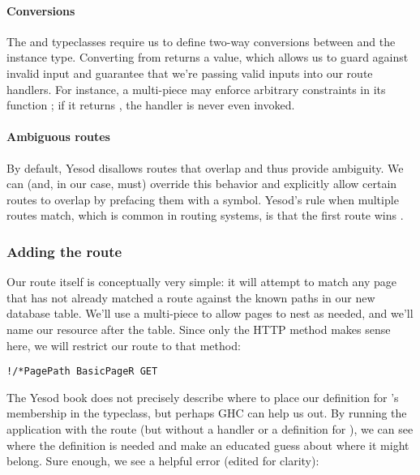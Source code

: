 \paragraph{Conversions} The  and  typeclasses require us to define two-way conversions between  and the instance type. Converting from  returns a  value, which allows us to guard against invalid input and guarantee that we're passing valid inputs into our route handlers. For instance, a multi-piece may enforce arbitrary constraints in its function ; if it returns , the handler is never even invoked.

\paragraph{Ambiguous routes} By default, Yesod disallows routes that overlap and thus provide ambiguity. We can (and, in our case, must) override this behavior and explicitly allow certain routes to overlap by prefacing them with a \code{!} symbol. Yesod's rule when multiple routes match, which is common in routing systems, is that the first route wins \cite{ybkRouting}.

\subsubsection{Adding the route}

Our route itself is conceptually very simple: it will attempt to match any page that has not already matched a route against the known paths in our new database table. We'll use a multi-piece to allow pages to nest as needed, and we'll name our resource after the  table. Since only the  HTTP method makes sense here, we will restrict our route to that method:

\begin{Verbatim}
!/*PagePath BasicPageR GET
\end{Verbatim}

The Yesod book does not precisely describe where to place our definition for 's membership in the  typeclass, but perhaps GHC can help us out. By running the application with the route (but without a handler or a definition for ), we can see where the definition is needed and make an educated guess about where it might belong. Sure enough, we see a helpful error (edited for clarity):

